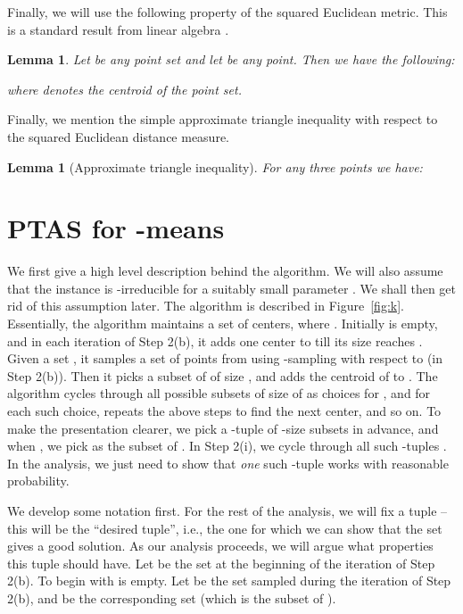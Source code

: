 \documentclass[a4paper]{article}
\newtheorem{lemma}[theorem]{Lemma}
\begin{document}
Finally, we will use the following property of the squared Euclidean metric. This is a standard result from linear algebra \cite{ps05}.

\begin{lemma}\label{lemma:2}
Let  be any point set and let  be any point. Then we have the following:

where  denotes the centroid of the point set.
\end{lemma}

Finally, we mention the simple approximate triangle inequality with respect to the squared Euclidean distance measure.

\begin{lemma}[Approximate triangle inequality]\label{lemma:3}
For any three points  we have:

\end{lemma}





\section{PTAS for -means}
\label{sec:algo}
We first give a high level description behind the  algorithm. We will also assume that the instance is -irreducible for a
suitably small parameter . We shall then get rid of this assumption later. The algorithm is described
in Figure~\ref{fig:k}. Essentially, the algorithm maintains a set  of centers,
where . Initially  is empty, and in each iteration of Step 2(b), it adds one center to  till
its size reaches . Given a set , it samples  a set of  points from  using -sampling with respect
to  (in Step 2(b)). Then it picks  a subset  of  of size ,
and adds the centroid of  to . The algorithm
cycles through all possible subsets of size  of  as choices for , and for each such choice,
repeats the above steps to find the next center, and so on.  To make the presentation clearer,
we pick a -tuple of -size subsets  in advance, and when , we pick  as the  subset of . 
In Step 2(i), we cycle through all such -tuples . In the analysis, we just need
to show that {\em one} such -tuple works with reasonable probability.


We develop some notation first. For the rest of the analysis, we will fix a tuple  --
this will be the ``desired tuple'', i.e., the one for which we can show that the set  gives a good solution.
As our analysis proceeds, we will argue what properties this tuple should have. Let  be the set 
at the beginning of the  iteration of Step 2(b). To begin with  is empty. Let 
be the set  sampled during the  iteration of Step 2(b), and  be the corresponding set 
(which is the  subset of ).
\end{document}
